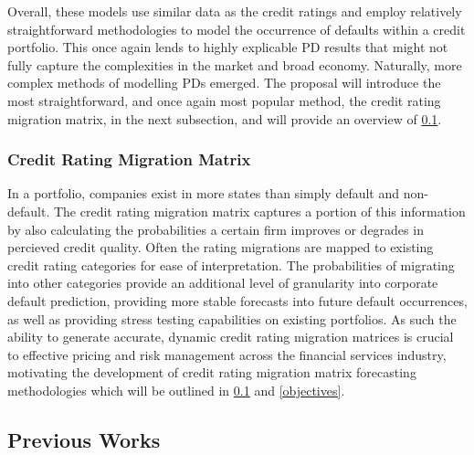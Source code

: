 \documentclass[10pt]{article}
\begin{document}
\begin{multicols*}{2}
Overall, these models use similar data as the credit ratings and employ relatively straightforward methodologies to model the occurrence of defaults within a credit portfolio. This once again lends to highly explicable PD results that might not fully capture the complexities in the market and broad economy.
Naturally, more complex methods of modelling PDs emerged. The proposal will introduce the most straightforward, and once again most popular method, the credit rating migration matrix, in the next subsection, and will provide an overview of  \ref{lit-review}.

\subsubsection{Credit Rating Migration Matrix}\label{crmm}

In a portfolio, companies exist in more states than simply default and non-default. The credit rating migration matrix captures a portion of this information by also calculating the probabilities a certain firm improves or degrades in percieved credit quality. 
Often the rating migrations are mapped to existing credit rating categories for ease of interpretation. The probabilities of migrating into other categories provide an additional level of granularity into corporate default prediction, providing more stable forecasts into future default occurrences, 
as well as providing stress testing capabilities on existing portfolios. As such the ability to generate accurate, dynamic credit rating migration matrices is crucial to effective pricing and risk management across the financial services industry, motivating the development of credit rating migration matrix forecasting methodologies which will be outlined in \ref{lit-review} and \ref{objectives}.

\subsection{Previous Works}\label{lit-review}


\end{multicols*}
\end{document}
